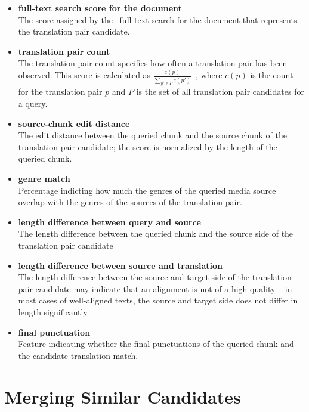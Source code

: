 \begin{itemize}
	
	\item \textbf{full-text search score for the document}\\
	The score assigned by the \postgres~full text search for the document that represents the translation pair candidate.
    
	\item \textbf{translation pair count}\\
	The translation pair count specifies how often a translation pair has been observed. This score is calculated as $\frac{c(p)}{ \sum_{p' \in P}{c(p')}  } $\ , where $c(p)$ is the count for the translation pair $p$ and $P$ is the set of all translation pair candidates for a query.
	
	\item \textbf{source-chunk edit distance}\\
	The edit distance between the queried chunk and the source chunk of the translation pair candidate; the score is normalized by the length of the queried chunk.
	
	\item \textbf{genre match}\\
	Percentage indicting how much the genres of the queried media source overlap with the genres of the sources of the translation pair.

	\item \textbf{length difference between query and source}\\
	The length difference between the queried chunk and the source side of the translation pair candidate 

	\item \textbf{length difference between source and translation}\\
	The length difference between the source and target side of the translation pair candidate may indicate that an alignment is not of a high quality -- in most cases of well-aligned texts, the source and target side does not differ in length significantly.
	
	\item \textbf{final punctuation}\\
	Feature indicating whether the final punctuations of the queried chunk and the candidate translation match.

\end{itemize}



\section{Merging Similar Candidates}

